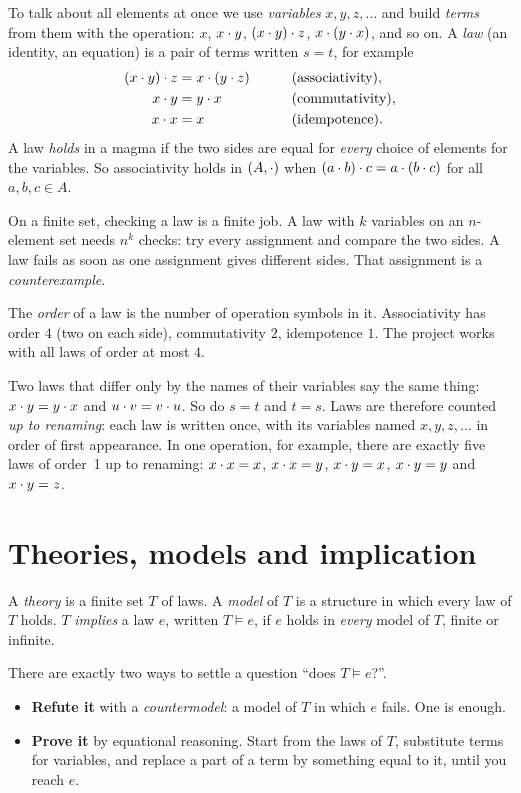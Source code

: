 \documentclass[11pt,a4paper]{article}
\begin{document}
To talk about all elements at once we use \emph{variables} $x,y,z,\dots$ and build \emph{terms} from them with the
operation: $x$, $x\cdot y$, $(x\cdot y)\cdot z$, $x\cdot(y\cdot x)$, and so on. A \emph{law} (an identity, an equation) is a
pair of terms written $s=t$, for example
\begin{alignat*}{2}
(x\cdot y)\cdot z &= x\cdot (y\cdot z) &\qquad& \text{(associativity)},\\
x\cdot y &= y\cdot x &\qquad& \text{(commutativity)},\\
x\cdot x &= x &\qquad& \text{(idempotence)}.
\end{alignat*}
A law \emph{holds} in a magma if the two sides are equal for \emph{every} choice of elements for the variables. So
associativity holds in $(A,\cdot)$ when $(a\cdot b)\cdot c=a\cdot(b\cdot c)$ for all $a,b,c\in A$.

On a finite set, checking a law is a finite job. A law with $k$ variables on an $n$-element set needs $n^k$ checks:
try every assignment and compare the two sides. A law fails as soon as one assignment gives different sides. That
assignment is a \emph{counterexample}.

The \emph{order} of a law is the number of operation symbols in it. Associativity has order $4$ (two on each side),
commutativity $2$, idempotence $1$. The project works with all laws of order at most $4$.

Two laws that differ only by the names of their variables say the same thing: $x\cdot y=y\cdot x$ and $u\cdot v=v\cdot u$.
So do $s=t$ and $t=s$. Laws are therefore counted \emph{up to renaming}: each law is written once, with its
variables named $x,y,z,\dots$ in order of first appearance. In one operation, for example, there are exactly five
laws of order~1 up to renaming: $x\cdot x=x$, $x\cdot x=y$, $x\cdot y=x$, $x\cdot y=y$
and $x\cdot y=z$.


\section{Theories, models and implication}

\begin{definition}
A \emph{theory} is a finite set $T$ of laws. A \emph{model} of $T$ is a structure in which every law of $T$ holds.
$T$ \emph{implies} a law $e$, written $T\models e$, if $e$ holds in \emph{every} model of $T$, finite or infinite.
\end{definition}

There are exactly two ways to settle a question ``does $T\models e$?''.
\begin{itemize}
\item \textbf{Refute it} with a \emph{countermodel}: a model of $T$ in which $e$ fails. One is enough.
\item \textbf{Prove it} by equational reasoning. Start from the laws of $T$, substitute terms for variables, and
  replace a part of a term by something equal to it, until you reach $e$.
\end{itemize}
\end{document}
